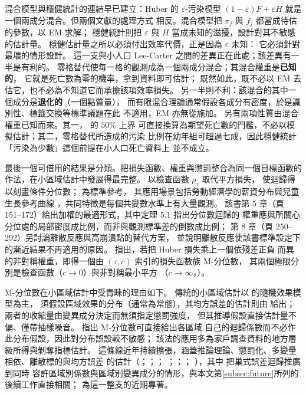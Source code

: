 \documentclass[UTF8, fontset=macnew, a4paper, 12pt]{ctexart}
\begin{document}
混合模型與穩健統計的連結早已建立：Huber 的 $\varepsilon$-污染模型
$(1-\varepsilon)F+\varepsilon H$ 就是一個兩成分混合。但兩個文獻的處理方式
相反。混合模型把 $\pi_j$ 與 $f_j$ 都當成待估的參數，以 EM 求解；
穩健統計則把 $\varepsilon$ 與 $H$ 當成未知的滋擾，設計對其不敏感的估計量。
穩健估計量之所以必須付出效率代價，正是因為 $\varepsilon$ 未知：
它必須針對最壞的情形設計。
這一支與小人口 Lee-Carter 之間的差異正在此處；該差異有一半是有利的。
零格替代使每一格的觀測成為一個兩成分混合；其混合權重是\textbf{已知的}，
它就是死亡數為零的機率，拿到資料即可估計；
既然如此，既不必以 EM 去估它，也不必為不知道它而承擔該項效率損失。
另一半則不利：該混合的其中一個成分是\textbf{退化的}（一個點質量），
而有限混合理論通常假設各成分有密度，於是識別性、標籤交換等標準議題在此
不適用，EM 亦無從施加。
另有兩項性質由混合權重已知而來。其一，\citet{donoho1983} 的 $50\%$ 上界
可直接換算為期望死亡數的門檻，不必以模擬估計；其二，零格替代所造成的污染
比例在幼年組可超過七成，因此穩健統計「污染為少數」這個前提在小人口死亡資料上
並不成立。

最後一個可借用的結果是分類。把損失函數、權重與懲罰整合為同一個目標函數的
作法，在小區域估計中發展得最完整。
\citet{koenker1978} 以檢查函數 $\rho_\tau$ 取代平方損失，
使迴歸得以刻畫條件分位數；\citet{koenker2005} 為標準參考，
其應用場景包括勞動經濟學的薪資分布與兒童生長參考曲線
\citep{wei2006}，共同特徵是每個共變數水準上有大量觀測。
該書第 5 章（頁 151--172）給出加權的最適形式，其中定理 5.1 指出分位數迴歸的
權重應與所關心分位處的局部密度成比例，而非與觀測標準差的倒數成比例；
第 8 章（頁 250--292）另討論離散反應與高崩潰點的替代方案，
並說明離散反應使該書標準設定下的漸近結果不再適用的原因。
\citet{breckling1988} 指出，若把 Huber 損失乘上一個依殘差正負
而異的非對稱權重，即得一個由 $(\tau,c)$ 索引的損失函數族 M-分位數，
其兩個極限分別是檢查函數（$c\to0$）與非對稱最小平方
（$c\to\infty$，\citealp{newey1987}）。

M-分位數在小區域估計中受青睞的理由如下。
傳統的小區域估計以 \citet{fay1979} 的隨機效果模型為主，
須假設區域效果的分布（通常為常態），其均方誤差的估計則由
\citet{prasad1990} 給出；兩者的收縮量由變異成分決定而無須指定懲罰強度，
但其推導假設直接估計量不偏、僅帶抽樣噪音。
\citet{chambers2006} 指出 M-分位數可直接給出各區域
自己的迴歸係數而不必作此分布假設，因此對分布誤設較不敏感；
該法的應用多為家戶調查資料的地方層級所得與剝奪指標估計。
這條線近年持續擴張，涵蓋推論理論、懲罰化、多變量相依、離散標的與均方誤差
的估計（\citealp{bianchi2018}；\citealp{hu2021}；\citealp{ranalli2023}；
\citealp{merlo2022}；\citealp{dawber2022}；\citealp{bugallo2025}；
\citealp{bugallo2026}），其中 \citet{lahiri2023} 把巢式誤差迴歸推廣到同時
容許區域別係數與區域別變異成分的情形，與本文第\ref{subsec:future}所列的
後續工作直接相關；\citet{jiang2026} 為這一整支的近期專著。
\end{document}
